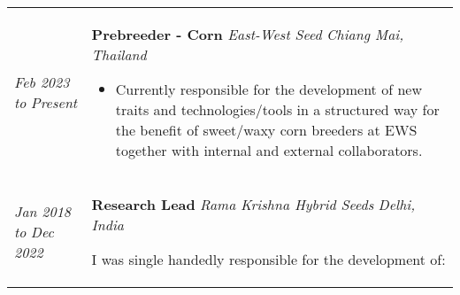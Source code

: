 ﻿\documentclass[a4paper]{article}
\begin{document}
\begin{tabular}{p{3cm} p{14cm}}
\vspace{0pt} 
\textit{Feb 2023}\newline
\textit{to}\newline
\textit{Present}\newline
& 
\vspace{0pt}
\textbf{Prebreeder - Corn}\newline
\textit{East-West Seed}\newline
\textit{Chiang Mai, Thailand}

\begin{itemize}[noitemsep,topsep=0pt]
  \item Currently responsible for the development of new traits and technologies/tools in a structured way for the benefit of sweet/waxy corn breeders at EWS together with internal and external collaborators.
\end{itemize}
%
\\
%
\vspace{0pt} 
\textit{Jan 2018}\newline
\textit{to}\newline
\textit{Dec 2022}\newline
& 
\vspace{0pt}
\textbf{Research Lead}\newline
\textit{Rama Krishna Hybrid Seeds}\newline
\textit{Delhi, India}

I was single handedly responsible for the development of:
\begin{itemize}[noitemsep,topsep=0pt]
 

\end{itemize}
\end{tabular}
\end{document}

